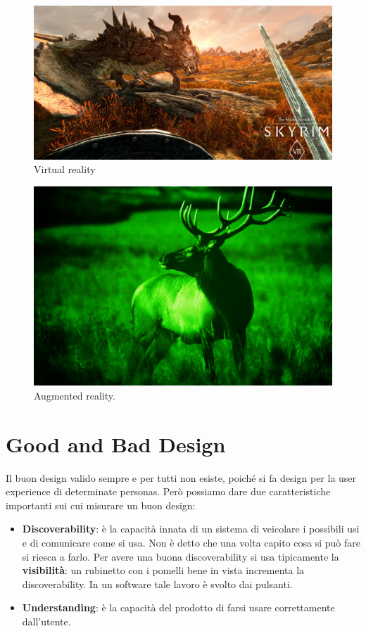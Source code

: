 \documentclass[a4paper,11pt,oneside]{book}
\begin{document}
\begin{figure}[!h]
	\centering
	\includegraphics[scale = 0.15]{immagini/SkyrymVR.png}
	\caption{Virtual reality}
\end{figure}\begin{figure}[!h]
	\centering
	\includegraphics[scale = 0.15]{immagini/Night_vision.jpeg}
	\caption{Augmented reality.}
\end{figure}

\pagebreak


\chapter{Good and Bad Design}
Il buon design valido sempre e per tutti non esiste, poiché si fa design per la user experience di determinate personas. Però possiamo dare due caratteristiche importanti sui cui misurare un buon design:

\begin{itemize}
	\item \textbf{Discoverability}: è la capacità innata di un sistema di veicolare i possibili usi e di comunicare come si usa. Non è detto che una volta capito cosa si può fare si riesca a farlo. Per avere una buona discoverability si usa tipicamente la \textbf{visibilità}: un rubinetto con i pomelli bene in vista incrementa la discoverability. In un software tale lavoro è svolto dai pulsanti.
	\item \textbf{Understanding}: è la capacità del prodotto di farsi usare correttamente dall'utente.
\end{itemize}
\end{document}
